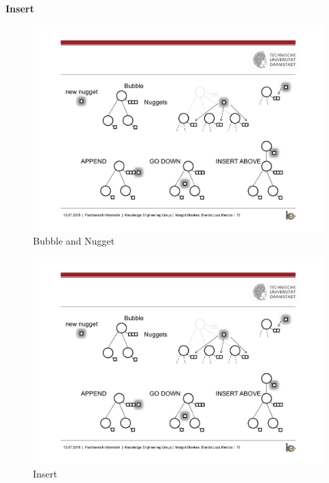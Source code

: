 \textbf{Insert}\\

\begin{figure}[H]
	\centering
	\includegraphics[trim=3cm 10cm 15cm 5.8cm, clip=true, width= \textwidth]{img/step2_func.pdf}
	\caption{Bubble and Nugget}
	\label{fig:jsd}
\end{figure}

\begin{figure}[H]
	\centering
	\includegraphics[trim=14cm 10cm 2.5cm 5.5cm, clip=true, width= \textwidth]{img/step2_func.pdf}
	\caption{Insert}
	\label{fig:jsd}
\end{figure}

